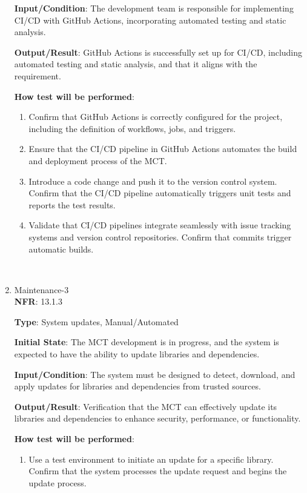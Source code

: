 \documentclass[12pt, titlepage]{article}
\begin{document}
\begin{enumerate}
\textbf{Input/Condition}: The development team is responsible for implementing CI/CD with GitHub Actions, incorporating automated testing and static analysis.

\textbf{Output/Result}: GitHub Actions is successfully set up for CI/CD, including automated testing and static analysis, and that it aligns with the requirement.

\textbf{How test will be performed}: 
\begin{enumerate}
    \item Confirm that GitHub Actions is correctly configured for the project, including the definition of workflows, jobs, and triggers.

    \item Ensure that the CI/CD pipeline in GitHub Actions automates the build and deployment process of the MCT.

    \item Introduce a code change and push it to the version control system. Confirm that the CI/CD pipeline automatically triggers unit tests and reports the test results.

    \item Validate that CI/CD pipelines integrate seamlessly with issue tracking systems and version control repositories. Confirm that commits trigger automatic builds.
\end{enumerate}

\\
 
    \item {Maintenance-3\\}
\textbf{NFR}: 13.1.3

\textbf{Type}: System updates, Manual/Automated

\textbf{Initial State}: The MCT development is in progress, and the system is expected to have the ability to update libraries and dependencies.

\textbf{Input/Condition}: The system must be designed to detect, download, and apply updates for libraries and dependencies from trusted sources.

\textbf{Output/Result}: Verification that the MCT can effectively update its libraries and dependencies to enhance security, performance, or functionality.

\textbf{How test will be performed}: 
\begin{enumerate}
    \item Use a test environment to initiate an update for a specific library. Confirm that the system processes the update request and begins the update process.


\end{enumerate}
\end{enumerate}
\end{document}

